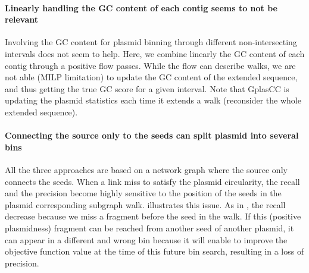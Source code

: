 \paragraph{Linearly handling the GC content of each contig seems to not be relevant}
Involving the GC content for plasmid binning through different non-intersecting intervals does not seem to help.
Here, we combine linearly the GC content of each contig through a positive flow passes.
While the flow can describe walks, we are not able (MILP limitation) to update the GC content of the extended sequence, and thus getting the true GC score for a given interval.
Note that GplasCC is updating the plasmid statistics each time it extends a walk (reconsider the whole extended sequence).

\paragraph{Connecting the source only to the seeds can split plasmid into several bins}
All the three approaches are based on a network graph where the source only connects the seeds.
When a link miss to satisfy the plasmid circularity, the recall and the precision become highly sensitive to the position of the seeds in the plasmid corresponding subgraph walk.
 illustrates this issue.
As in , the recall decrease because we miss a fragment before the seed in the walk.
If this (positive plasmidness) fragment can be reached from another seed of another plasmid, it can appear in a different and wrong bin because it will enable to improve the objective function value at the time of this future bin search, resulting in a loss of precision.

